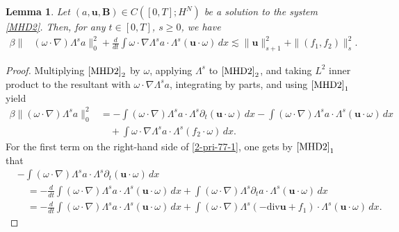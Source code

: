 \documentclass[12pt, reqno]{amsart}
\numberwithin{equation}{section}
\numberwithin{equation}{section}
\numberwithin{equation}{section}
\newtheorem{lemma}[theorem]{Lemma}
\numberwithin{equation}{section}
\theoremstyle{remark}
\def\u{ \mathbf{u} }
\def\b{ \mathbf{B} }
\begin{document}
\begin{lemma}\label{lemma-pri3-3-1}
Let $(a,\u,\b) \in C([0, T];H^N)$ be a solution to the  system \eqref{MHD2}. Then, for any $t\in[0,T]$, $s\geq0$, we have
\begin{equation}
\begin{split}\label{pri-199}
\beta\|&(\omega\cdot\nabla)\Lambda^{s}a\|_0^2+\frac{d}{dt}\int \omega\cdot\nabla\Lambda^{s}a\cdot\Lambda^{s}(\u\cdot\omega)\,dx\lesssim \|\u\|_{s+1}^{2}+\|(f_1,f_2)\|_{s}^{2}.
\end{split}
\end{equation}
\end{lemma}
\begin{proof}
Multiplying  $\eqref{MHD2}_{2}$ by $\omega$, applying $\Lambda^{s}$ to $\eqref{MHD2}_{2}$, and taking $L^2$ inner product to the resultant with $\omega\cdot\nabla\Lambda^{s}a$,
integrating by parts, and using $\eqref{MHD2}_{1}$ yield
\begin{equation}\begin{split}\label{2-pri-77-1}
\beta\|(\omega\cdot\nabla)\Lambda^{s}a\|_0^2
&=-\int (\omega\cdot\nabla)\Lambda^{s}a\cdot\Lambda^{s}\partial_t(\u\cdot\omega)\,dx-\int (\omega\cdot\nabla)\Lambda^{s}a\cdot\Lambda^{s}(\u\cdot\omega)\,dx\\&\quad+\int \omega\cdot\nabla\Lambda^{s}a \cdot\Lambda^{s}(f_2\cdot\omega)\,dx.
\end{split}\end{equation}
For the first term on the right-hand side of \eqref{2-pri-77-1}, one gets by $\eqref{MHD2}_1$ that
\begin{equation*}\begin{split}%
&-\int (\omega\cdot\nabla)\Lambda^{s}a\cdot\Lambda^{s}\partial_t(\u\cdot\omega)\,dx\\
&\quad =-\frac{d}{dt}\int (\omega\cdot\nabla)\Lambda^{s}a\cdot\Lambda^{s}(\u\cdot\omega)\,dx+\int (\omega\cdot\nabla)\Lambda^{s}\partial_ta\cdot\Lambda^{s}(\u\cdot\omega)\,dx\\
&\quad =-\frac{d}{dt}\int (\omega\cdot\nabla)\Lambda^{s}a\cdot\Lambda^{s}(\u\cdot\omega)\,dx+\int(\omega\cdot\nabla)\Lambda^{s}(-\text{div}\u+f_1)\cdot\Lambda^{s}(\u\cdot\omega)\,dx.
\end{split}\end{equation*}

\end{proof}
\end{document}
